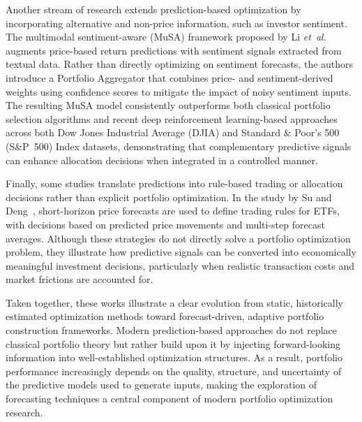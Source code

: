 Another stream of research extends prediction-based optimization by incorporating alternative and non-price information, such as investor sentiment. The multimodal sentiment-aware (MuSA) framework proposed by Li \emph{et~al.}~\cite{de270} augments price-based return predictions with sentiment signals extracted from textual data. Rather than directly optimizing on sentiment forecasts, the authors introduce a Portfolio Aggregator that combines price- and sentiment-derived weights using confidence scores to mitigate the impact of noisy sentiment inputs. The resulting MuSA model consistently outperforms both classical portfolio selection algorithms and recent deep reinforcement learning-based approaches across both Dow Jones Industrial Average (DJIA) and Standard \& Poor's 500 (S\&P~500) Index datasets, demonstrating that complementary predictive signals can enhance allocation decisions when integrated in a controlled manner.

Finally, some studies translate predictions into rule-based trading or allocation decisions rather than explicit portfolio optimization. In the study by Su and Deng~\cite{34309}, short-horizon price forecasts are used to define trading rules for ETFs, with decisions based on predicted price movements and multi-step forecast averages. Although these strategies do not directly solve a portfolio optimization problem, they illustrate how predictive signals can be converted into economically meaningful investment decisions, particularly when realistic transaction costs and market frictions are accounted for.

Taken together, these works illustrate a clear evolution from static, historically estimated optimization methods toward forecast-driven, adaptive portfolio construction frameworks. Modern prediction-based approaches do not replace classical portfolio theory but rather build upon it by injecting forward-looking information into well-established optimization structures. As a result, portfolio performance increasingly depends on the quality, structure, and uncertainty of the predictive models used to generate inputs, making the exploration of forecasting techniques a central component of modern portfolio optimization research.

